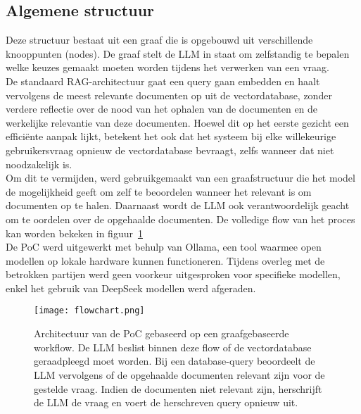 \subsection{Algemene structuur}

Deze structuur bestaat uit een graaf die is opgebouwd uit verschillende knooppunten (nodes). De graaf stelt de LLM in staat om zelfstandig te bepalen welke keuzes gemaakt moeten worden tijdens het verwerken van een vraag.
\\[1em]
De standaard RAG-architectuur gaat een query gaan embedden en haalt vervolgens de meest relevante documenten op uit de vectordatabase, zonder verdere reflectie over de nood van het ophalen van de documenten en de werkelijke relevantie van deze documenten. Hoewel dit op het eerste gezicht een efficiënte aanpak lijkt, betekent het ook dat het systeem bij elke willekeurige gebruikersvraag opnieuw de vectordatabase bevraagt, zelfs wanneer dat niet noodzakelijk is.
\\[1em]
Om dit te vermijden, werd gebruikgemaakt van een graafstructuur die het model de mogelijkheid geeft om zelf te beoordelen wanneer het relevant is om documenten op te halen. Daarnaast wordt de LLM ook verantwoordelijk geacht om te oordelen over de opgehaalde documenten. De volledige flow van het proces kan worden bekeken in figuur~\ref{fig:Architectuur}
\\[1em]
De PoC werd uitgewerkt met behulp van Ollama, een tool waarmee open modellen op lokale hardware kunnen functioneren. Tijdens overleg met de betrokken partijen werd geen voorkeur uitgesproken voor specifieke modellen, enkel het gebruik van DeepSeek modellen werd afgeraden.

\begin{figure}[H]
    \texttt{[image: flowchart.png]}
    \caption{Architectuur van de PoC gebaseerd op een graafgebaseerde workflow. De LLM beslist binnen deze flow of de vectordatabase geraadpleegd moet worden. Bij een database-query beoordeelt de LLM vervolgens of de opgehaalde documenten relevant zijn voor de gestelde vraag. Indien de documenten niet relevant zijn, herschrijft de LLM de vraag en voert de herschreven query opnieuw uit.}
    \label{fig:Architectuur}
\end{figure}



